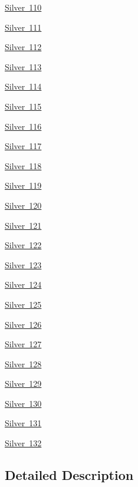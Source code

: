 \begin{DoxyCompactItemize}
\mbox{\hyperlink{group___isotope_const-_silver-_ag110}{Silver 110}}
\item 
\mbox{\hyperlink{group___isotope_const-_silver-_ag111}{Silver 111}}
\item 
\mbox{\hyperlink{group___isotope_const-_silver-_ag112}{Silver 112}}
\item 
\mbox{\hyperlink{group___isotope_const-_silver-_ag113}{Silver 113}}
\item 
\mbox{\hyperlink{group___isotope_const-_silver-_ag114}{Silver 114}}
\item 
\mbox{\hyperlink{group___isotope_const-_silver-_ag115}{Silver 115}}
\item 
\mbox{\hyperlink{group___isotope_const-_silver-_ag116}{Silver 116}}
\item 
\mbox{\hyperlink{group___isotope_const-_silver-_ag117}{Silver 117}}
\item 
\mbox{\hyperlink{group___isotope_const-_silver-_ag118}{Silver 118}}
\item 
\mbox{\hyperlink{group___isotope_const-_silver-_ag119}{Silver 119}}
\item 
\mbox{\hyperlink{group___isotope_const-_silver-_ag120}{Silver 120}}
\item 
\mbox{\hyperlink{group___isotope_const-_silver-_ag121}{Silver 121}}
\item 
\mbox{\hyperlink{group___isotope_const-_silver-_ag122}{Silver 122}}
\item 
\mbox{\hyperlink{group___isotope_const-_silver-_ag123}{Silver 123}}
\item 
\mbox{\hyperlink{group___isotope_const-_silver-_ag124}{Silver 124}}
\item 
\mbox{\hyperlink{group___isotope_const-_silver-_ag125}{Silver 125}}
\item 
\mbox{\hyperlink{group___isotope_const-_silver-_ag126}{Silver 126}}
\item 
\mbox{\hyperlink{group___isotope_const-_silver-_ag127}{Silver 127}}
\item 
\mbox{\hyperlink{group___isotope_const-_silver-_ag128}{Silver 128}}
\item 
\mbox{\hyperlink{group___isotope_const-_silver-_ag129}{Silver 129}}
\item 
\mbox{\hyperlink{group___isotope_const-_silver-_ag130}{Silver 130}}
\item 
\mbox{\hyperlink{group___isotope_const-_silver-_ag131}{Silver 131}}
\item 
\mbox{\hyperlink{group___isotope_const-_silver-_ag132}{Silver 132}}
\end{DoxyCompactItemize}


\subsection{Detailed Description}
